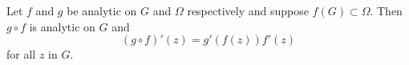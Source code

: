 Let $f$ and $g$ be analytic on $G$ and $\Omega$ respectively and suppose $f(G) \subset \Omega$. Then $g \circ f$ is analytic on $G$ and
$$(g \circ f)'(z) = g'(f(z)) f'(z)$$
for all $z$ in $G$.
